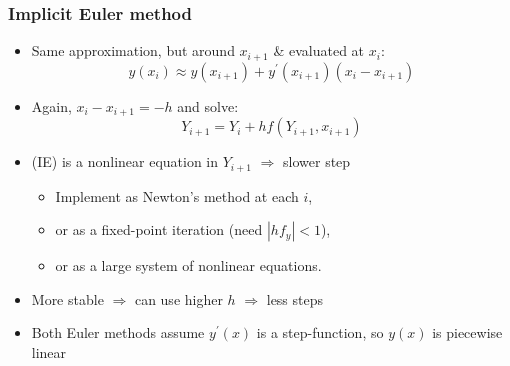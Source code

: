 \documentclass[bigger,handout]{beamer}
\newenvironment{stepitemize}{\begin{itemize}[<+->]}{\end{itemize} }
\begin{document}
\begin{frame}%
  
\frametitle{Implicit Euler method}

\begin{stepitemize}
\item Same approximation, but around $x_{i+1}$ \& evaluated at $x_{i}$:%
\begin{equation*}
y(x_{i})\approx y(x_{i+1})+y^{\prime }(x_{i+1})(x_{i}-x_{i+1})
\end{equation*}

\item Again, $x_{i}-x_{i+1}=-h$ and solve: 
\begin{equation}
Y_{i+1}=Y_{i}+hf(Y_{i+1},x_{i+1})  \tag{IE}
\end{equation}

\item (IE) is a nonlinear equation in $Y_{i+1}$ $\Rightarrow $ slower step

\begin{itemize}
\item Implement as Newton's method at each $i$,

\item or as a fixed-point iteration (need $\left\vert hf_{y}\right\vert <1$),

\item or as a large system of nonlinear equations.
\end{itemize}

\item More stable $\Rightarrow $ can use higher $h$ $\Rightarrow $ less steps

\item Both Euler methods assume $y^{\prime }(x)$ is a step-function, \newline
so $y(x)$ is piecewise linear
\end{stepitemize}

  
 
\end{frame}%
  
 
 
\end{document}
